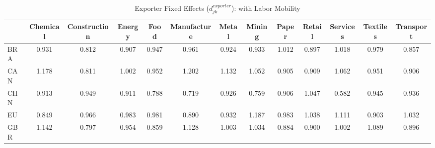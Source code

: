 \begin{table}[htbp]
\centering
\caption{Exporter Fixed Effects ($d_{jk}^{exporter}$): with Labor Mobility} 
\label{tab:exporter_effects}
\begin{tabular}{lcccccccccccc}
  \hline
 & Chemical & Construction & Energy & Food & Manufacture & Metal & Mining & Paper & Retail & Services & Textiles & Transport \\ 
  \hline
BRA & \textcolor[RGB]{132,85,123}{0.931} & \textcolor[RGB]{219,142,36}{0.812} & \textcolor[RGB]{164,106,91}{0.907} & \textcolor[RGB]{115,74,140}{0.947} & \textcolor[RGB]{100,65,155}{0.961} & \textcolor[RGB]{138,89,117}{0.924} & \textcolor[RGB]{125,81,130}{0.933} & \textcolor[RGB]{64,41,191}{1.012} & \textcolor[RGB]{181,117,74}{0.897} & \textcolor[RGB]{62,40,193}{1.018} & \textcolor[RGB]{89,58,166}{0.979} & \textcolor[RGB]{208,135,47}{0.857} \\ 
  CAN & \textcolor[RGB]{11,7,244}{1.178} & \textcolor[RGB]{223,144,32}{0.811} & \textcolor[RGB]{74,48,181}{1.002} & \textcolor[RGB]{106,69,149}{0.952} & \textcolor[RGB]{4,3,251}{1.202} & \textcolor[RGB]{23,15,232}{1.132} & \textcolor[RGB]{40,26,215}{1.052} & \textcolor[RGB]{174,113,81}{0.905} & \textcolor[RGB]{162,104,94}{0.909} & \textcolor[RGB]{36,23,219}{1.062} & \textcolor[RGB]{108,70,147}{0.951} & \textcolor[RGB]{168,109,87}{0.906} \\ 
  CHN & \textcolor[RGB]{153,99,102}{0.913} & \textcolor[RGB]{113,73,142}{0.949} & \textcolor[RGB]{159,103,96}{0.911} & \textcolor[RGB]{236,153,19}{0.788} & \textcolor[RGB]{246,160,8}{0.719} & \textcolor[RGB]{136,88,119}{0.926} & \textcolor[RGB]{242,157,13}{0.759} & \textcolor[RGB]{170,110,85}{0.906} & \textcolor[RGB]{45,29,210}{1.047} & \textcolor[RGB]{253,164,2}{0.582} & \textcolor[RGB]{117,76,138}{0.945} & \textcolor[RGB]{123,80,132}{0.936} \\ 
  EU & \textcolor[RGB]{212,138,42}{0.849} & \textcolor[RGB]{96,62,159}{0.966} & \textcolor[RGB]{85,55,170}{0.983} & \textcolor[RGB]{87,56,168}{0.981} & \textcolor[RGB]{189,122,66}{0.890} & \textcolor[RGB]{130,84,125}{0.932} & \textcolor[RGB]{6,4,249}{1.187} & \textcolor[RGB]{83,54,172}{0.983} & \textcolor[RGB]{47,30,208}{1.038} & \textcolor[RGB]{28,18,227}{1.111} & \textcolor[RGB]{176,114,79}{0.903} & \textcolor[RGB]{51,33,204}{1.032} \\ 
  GBR & \textcolor[RGB]{21,14,234}{1.142} & \textcolor[RGB]{230,148,26}{0.797} & \textcolor[RGB]{102,66,153}{0.954} & \textcolor[RGB]{204,132,51}{0.859} & \textcolor[RGB]{25,16,230}{1.128} & \textcolor[RGB]{70,45,185}{1.003} & \textcolor[RGB]{49,32,206}{1.034} & \textcolor[RGB]{191,124,64}{0.884} & \textcolor[RGB]{178,115,76}{0.900} & \textcolor[RGB]{72,47,183}{1.002} & \textcolor[RGB]{32,21,223}{1.089} & \textcolor[RGB]{185,120,70}{0.896} \\ 

\end{tabular}
\end{table}
